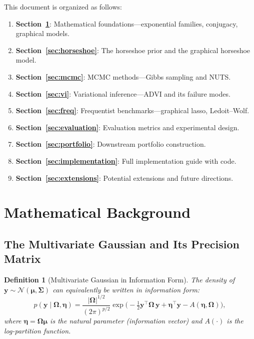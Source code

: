 \documentclass[11pt,a4paper]{article}
\newtheorem{definition}[theorem]{Definition}
\newcommand{\Normal}{\mathcal{N}}
\newcommand{\bOmega}{\bm{\Omega}}
\newcommand{\bSigma}{\bm{\Sigma}}
\begin{document}
This document is organized as follows:
\begin{enumerate}[nosep]
  \item \textbf{Section~\ref{sec:background}}: Mathematical foundations---exponential families, conjugacy, graphical models.
  \item \textbf{Section~\ref{sec:horseshoe}}: The horseshoe prior and the graphical horseshoe model.
  \item \textbf{Section~\ref{sec:mcmc}}: MCMC methods---Gibbs sampling and NUTS.
  \item \textbf{Section~\ref{sec:vi}}: Variational inference---ADVI and its failure modes.
  \item \textbf{Section~\ref{sec:freq}}: Frequentist benchmarks---graphical lasso, Ledoit--Wolf.
  \item \textbf{Section~\ref{sec:evaluation}}: Evaluation metrics and experimental design.
  \item \textbf{Section~\ref{sec:portfolio}}: Downstream portfolio construction.
  \item \textbf{Section~\ref{sec:implementation}}: Full implementation guide with code.
  \item \textbf{Section~\ref{sec:extensions}}: Potential extensions and future directions.
\end{enumerate}

\section{Mathematical Background}\label{sec:background}

\subsection{The Multivariate Gaussian and Its Precision Matrix}

\begin{definition}[Multivariate Gaussian in Information Form]
The density of $\bm{y} \sim \Normal(\bm{\mu}, \bSigma)$ can equivalently be written in \emph{information form}:
\begin{equation}
  p(\bm{y} \mid \bOmega, \bm{\eta}) = \frac{|\bOmega|^{1/2}}{(2\pi)^{p/2}} \exp\!\Big(-\tfrac{1}{2}\bm{y}^\top \bOmega\,\bm{y} + \bm{\eta}^\top\bm{y} - A(\bm{\eta},\bOmega)\Big),
\end{equation}
where $\bm{\eta} = \bOmega\bm{\mu}$ is the \emph{natural parameter} (information vector) and $A(\cdot)$ is the log-partition function.
\end{definition}
\end{document}
